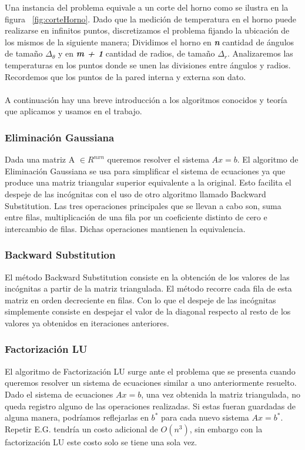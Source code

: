 Una instancia del problema equivale a un corte del horno como se ilustra en la figura ~\ref{fig:corteHorno}. Dado que la medición de temperatura en el horno puede realizarse en infinitos puntos, discretizamos el problema fijando la ubicación de los mismos de la siguiente manera; Dividimos el horno en \textbf{\textit{n}} cantidad de ángulos de tamaño $\Delta_{\theta}$ y en \textbf{\textit{m + 1}} cantidad de radios, de tamaño $\Delta_{r}$. Analizaremos las temperaturas en los puntos donde se unen las divisiones entre ángulos y radios. Recordemos que los puntos de la pared interna y externa son dato.\\
\\






A continuación hay una breve introducción a los algoritmos conocidos y teoría que aplicamos y usamos en el trabajo.

\subsubsection{Eliminación Gaussiana}
Dada una matriz A $\in R^{nxn}$ queremos resolver el sistema $Ax = b$. El algoritmo de Eliminación Gaussiana se usa para simplificar el sistema de ecuaciones ya que produce una matriz triangular superior equivalente a la original. Esto facilita el despeje de las incógnitas con el uso de otro algoritmo llamado Backward Substitution. Las tres operaciones principales que se llevan a cabo son, suma entre filas, multiplicación de una fila por un coeficiente distinto de cero e intercambio de filas. Dichas operaciones mantienen la equivalencia.

\subsubsection{Backward Substitution}
El método Backward Substitution consiste en la obtención de los valores de las incógnitas a partir de la matriz triangulada. El método recorre cada fila de esta matriz en orden decreciente en filas. Con lo que el despeje de las incógnitas simplemente consiste en despejar el valor de la diagonal respecto al resto de los valores ya obtenidos en iteraciones anteriores.

\subsubsection{Factorización LU}
El algoritmo de Factorización LU surge ante el problema que se presenta cuando queremos resolver un sistema de ecuaciones similar a uno anteriormente resuelto. Dado el sistema de ecuaciones $Ax = b$, una vez obtenida la matriz triangulada, no queda registro alguno de las operaciones realizadas. Si estas fueran guardadas de alguna manera, podríamos reflejarlas en $b^{*}$  para cada nuevo sistema $Ax = b^{*}$. Repetir E.G. tendría un costo adicional de $O(n^{3})$, sin embargo con la factorización LU este costo solo se tiene una sola vez.


